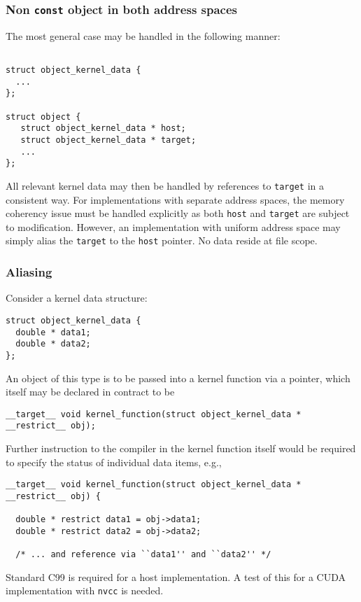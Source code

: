 \subsubsection{Non \texttt{const} object in both address spaces}

The most general case may be handled in the following manner:
\begin{lstlisting}

struct object_kernel_data {
  ...
};

struct object {
   struct object_kernel_data * host;
   struct object_kernel_data * target;
   ...
};

\end{lstlisting}
All relevant kernel data may then be handled by references to
\texttt{target} in a consistent way. For implementations with
separate address spaces, the memory coherency issue
must be handled explicitly as both \texttt{host} and \texttt{target}
are subject to modification. However, an implementation with uniform
address space may simply alias the \texttt{target} to the \texttt{host}
pointer. No data reside at file scope.

\subsubsection{Aliasing}
Consider a kernel data structure:
\begin{lstlisting}
struct object_kernel_data {
  double * data1;
  double * data2;
};
\end{lstlisting}
An object of this type is to be passed into a kernel function via a pointer,
which itself may be declared in contract to be
\begin{lstlisting}
__target__ void kernel_function(struct object_kernel_data * __restrict__ obj);
\end{lstlisting}
Further instruction to the compiler in the kernel function itself would
be required to specify the status of individual data items, e.g.,
\begin{lstlisting}
__target__ void kernel_function(struct object_kernel_data * __restrict__ obj) {

  double * restrict data1 = obj->data1;
  double * restrict data2 = obj->data2;

  /* ... and reference via ``data1'' and ``data2'' */
\end{lstlisting}
Standard C99 is required for a host implementation.
A test of this for a CUDA implementation with \texttt{nvcc} is needed.


